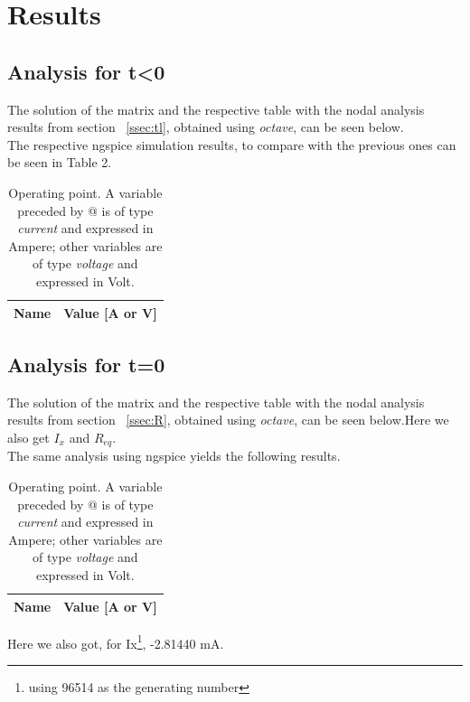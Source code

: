 \section{Results}
\subsection{Analysis for t\textless0}
\label{ssec:lessthan}
The solution of the matrix and the respective table with the nodal analysis results from section ~\ref{ssec:tl}, obtained using \textit{octave}, can be seen below.\\

The respective ngspice simulation results, to compare with the previous ones can be seen in Table 2.\\
\begin{table}[H]
  \centering
  \begin{tabular}{|l|r|}
    \hline    
    {\bf Name} & {\bf Value [A or V]} \\ \hline
    
  \end{tabular}
  \caption{Operating point. A variable preceded by @ is of type {\em current}
    and expressed in Ampere; other variables are of type {\it voltage} and expressed in
    Volt.}
  \label{tab:op}
\end{table}

\subsection{Analysis for t=0}
\label{ssec:equal}
The solution of the matrix and the respective table with the nodal analysis results from section ~\ref{ssec:R}, obtained using \textit{octave}, can be seen below.Here we also get $I_x$ and $R_{eq}$.\\

The same analysis using ngspice yields the following results.\\
\begin{table}[H]
  \centering
  \begin{tabular}{|l|r|}
    \hline    
    {\bf Name} & {\bf Value [A or V]} \\ \hline
    
  \end{tabular}
  \caption{Operating point. A variable preceded by @ is of type {\em current}
    and expressed in Ampere; other variables are of type {\it voltage} and expressed in
    Volt.}
  \label{tab:ops}
\end{table}
Here we also got, for Ix\footnote{using 96514 as the generating number}, -2.81440 mA.\\
